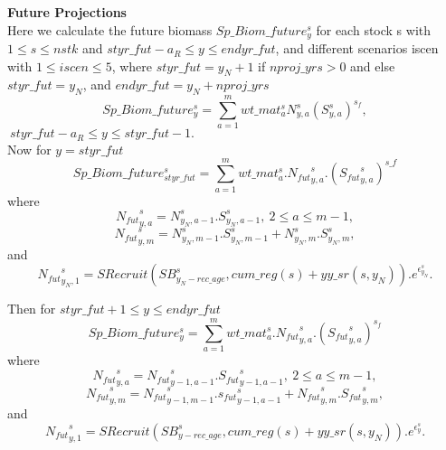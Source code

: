 \documentclass{article}
\begin{document}
\textbf{Future Projections}\\
Here we calculate the future biomass $Sp\_Biom\_future^s_{y}$ for each stock s with $1 \leq s \leq nstk$ and $styr\_fut-a_R\leq y \leq endyr\_fut$, and different scenarios iscen with $1\leq iscen \leq 5$, where $styr\_fut=y_N+1$ if $nproj\_yrs>0$ and else $styr\_fut=y_N$, and $endyr\_fut=y_N+nproj\_yrs$
\begin{equation}
    Sp\_Biom\_future^s_y=\sum_{a=1}^mwt\_{mat}^s_a N^s_{y,a}(S^s_{y,a})^{s_f}, 
\end{equation}
$\ styr\_fut-a_R\leq y \leq styr\_fut-1.$\\

Now for $y=styr\_fut$
\begin{equation}
    Sp\_Biom\_future^s_{styr\_fut}= \sum_{a=1}^mwt\_{mat}^s_a.{N_{fut}}^s_{y,a}.({{S_{fut}}^s_{y,a}})^{s\_f}
\end{equation}
where 
\begin{equation}
    {N_{fut}}^s_{y,a}=N^s_{y_N,a-1}.S^s_{y_N,a-1}, \ 2\leq a \leq m-1,
\end{equation}
\begin{equation}
    {N_{fut}}^s_{y,m}=N^s_{y_N,m-1}.S^s_{y_N,m-1}+N^s_{y_N,m}.S^s_{y_N,m},
\end{equation}
and 
\begin{equation}
    {N_{fut}}^s_{y_N,1}=SRecruit(SB^s_{y_N-rec\_age},cum\_reg(s)+yy\_sr(s,y_N)).e^{\epsilon^s_{y_N}}.
\end{equation}

Then for $styr\_fut+1 \leq y \leq endyr\_fut$
\begin{equation}
    Sp\_Biom\_future^s_y = \sum_{a=1}^m wt\_mat^s_{a}.{N_{fut}}^s_{y,a}.({S_{fut}}^s_{y,a})^{s_f}
\end{equation}
where
\begin{equation}
   {N_{fut}}^s_{y,a}={N_{fut}}^s_{y-1,a-1}.{S_{fut}}^s_{y-1,a-1},  \ 2\leq a \leq m-1,
\end{equation}
\begin{equation}
    {N_{fut}}^s_{y,m}={N_{fut}}^s_{y-1,m-1}.{s_{fut}}^s_{y-1,a-1} + {N_{fut}}^s_{y,m}.{S_{fut}}^s_{y,m},
\end{equation}
and
\begin{equation}
    {N_{fut}}^s_{y,1}=SRecruit(SB^s_{y-rec\_age},cum\_reg(s)+yy\_sr(s,y_N)).e^{\epsilon^s_{y}}.
\end{equation}
\end{document}
